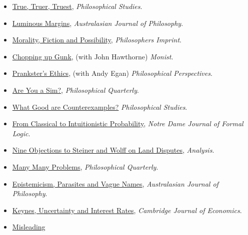 \documentclass[
  10pt,
  letterpaper,
  DIV=11,
  numbers=noendperiod,
  twoside]{scrartcl}
\begin{document}
\begin{itemize}
{  Phenomenological Research}.
\item
  \href{https://brian.weatherson.org/quarto/posts/ttt/true-truer-truest.html}{True,
  Truer, Truest}, \emph{Philosophical Studies}.
\item
  \href{https://brian.weatherson.org/quarto/posts/lummarg/luminous-margins.html}{Luminous
  Margins}, \emph{Australasian Journal of Philosophy}.
\item
  \href{https://brian.weatherson.org/quarto/posts/mfp/morality-fiction-and-possibility.html}{Morality,
  Fiction and Possibility}, \emph{Philosophers Imprint}.
\item
  \href{https://brian.weatherson.org/quarto/posts/gunk/chopping-up-gunk.html}{Chopping
  up Gunk}, (with John Hawthorne) \emph{Monist}.
\item
  \href{https://brian.weatherson.org/quarto/posts/prank/pranksters-ethics.html}{Prankster's
  Ethics}, (with Andy Egan) \emph{Philosophical Perspectives}.
\item
  \href{https://brian.weatherson.org/quarto/posts/sims/are-you-a-sim.html}{Are
  You a Sim?}, \emph{Philosophical Quarterly}.
\item
  \href{https://brian.weatherson.org/quarto/posts/wgac/what-good-are-counterexamples.html}{What
  Good are Counterexamples?} \emph{Philosophical Studies}.
\item
  \href{https://brian.weatherson.org/quarto/posts/conprob/from-classical-to-intuitionistic-probability.html}{From
  Classical to Intuitionistic Probability}, \emph{Notre Dame Journal of
  Formal Logic}.
\item
  \href{https://brian.weatherson.org/quarto/posts/nine-obj/nine-objections-to-steiner-and-wolff-on-land-disputes.html}{Nine
  Objections to Steiner and Wolff on Land Disputes}, \emph{Analysis}.
\item
  \href{https://brian.weatherson.org/quarto/posts/mmp/many-many-problems.html}{Many
  Many Problems}, \emph{Philosophical Quarterly}.
\item
  \href{https://brian.weatherson.org/quarto/posts/epvn/epistemicism-parasites-and-vague-names.html}{Epistemicism,
  Parasites and Vague Names}, \emph{Australasian Journal of Philosophy}.
\item
  \href{https://brian.weatherson.org/quarto/posts/kuir/keynes-uncertainty-and-interest-rates.html}{Keynes,
  Uncertainty and Interest Rates}, \emph{Cambridge Journal of
  Economics}.
\item
  \href{https://brian.weatherson.org/quarto/posts/misindex/misleading-indexicals.html}{Misleading
}
\end{itemize}
\end{document}
